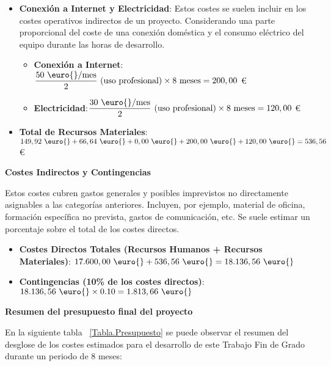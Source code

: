 \begin{itemize}
    \item\textbf{Conexión a Internet y Electricidad}:
    Estos costes se suelen incluir en los costes operativos indirectos de un proyecto. Considerando una parte proporcional del coste de una conexión doméstica y el consumo eléctrico del equipo durante las horas de desarrollo.
    
        \begin{itemize}
        
            \item\textbf{Conexión a Internet}:$\displaystyle \frac{50 \text{ \euro{}/mes}}{2} \text{ (uso profesional)} \times 8 \text{ meses} = 200,00 $ \euro{}
            
            \item\textbf{Electricidad}:$\displaystyle \frac{30 \text{ \euro{}/mes}}{2} \text{ (uso profesional)} \times 8 \text{ meses} = 120,00 $ \euro{}
                    
        \end{itemize}    
    
    \item\textbf{Total de Recursos Materiales}:$\displaystyle 149,92 \text{ \euro{}} + 66,64 \text{ \euro{}} + 0,00 \text{ \euro{}} + 200,00 \text{ \euro{}} + 120,00 \text{ \euro{}} = 536,56 $ \euro{}
   
\end{itemize}

\textbf{Costes Indirectos y Contingencias} 

Estos costes cubren gastos generales y posibles imprevistos no directamente asignables a las categorías anteriores. Incluyen, por ejemplo, material de oficina, formación específica no prevista, gastos de comunicación, etc. Se suele estimar un porcentaje sobre el total de los costes directos.
\begin{itemize}
    \item\textbf{Costes Directos Totales (Recursos Humanos + Recursos Materiales)}: $\displaystyle 17.600,00 \text{ \euro{}} + 536,56 \text{ \euro{}} = 18.136,56 \text{ \euro{}}$
    
    \item\textbf{Contingencias (10\% de los costes directos)}:$\displaystyle 18.136,56 \text{ \euro{}} \times 0.10 = 1.813,66 \text{ \euro{}}$
\end{itemize}

\textbf{Resumen del presupuesto final del proyecto}

En la siguiente tabla ~\ref{Tabla.Presupuesto} se puede observar el resumen del desglose de los costes estimados para el desarrollo de este Trabajo Fin de Grado durante un periodo de 8 meses:

